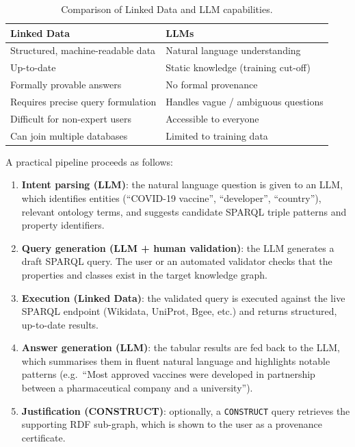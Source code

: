 \documentclass[12pt,a4paper]{article}
\begin{document}
\begin{table}[h]
\centering
\begin{tabular}{p{5.5cm} p{5.5cm}}
\toprule
\textbf{Linked Data} & \textbf{LLMs} \\
\midrule
Structured, machine-readable data & Natural language understanding \\
Up-to-date & Static knowledge (training cut-off) \\
Formally provable answers & No formal provenance \\
Requires precise query formulation & Handles vague / ambiguous questions \\
Difficult for non-expert users & Accessible to everyone \\
Can join multiple databases & Limited to training data \\
\bottomrule
\end{tabular}
\caption{Comparison of Linked Data and LLM capabilities.}
\label{tab:comparison}
\end{table}

A practical pipeline proceeds as follows:
\begin{enumerate}
  \item \textbf{Intent parsing (LLM)}: the natural language question is given
        to an LLM, which identifies entities (``COVID-19 vaccine'',
        ``developer'', ``country''), relevant ontology terms, and suggests
        candidate SPARQL triple patterns and property identifiers.
  \item \textbf{Query generation (LLM + human validation)}: the LLM generates
        a draft SPARQL query. The user or an automated validator checks that
        the properties and classes exist in the target knowledge graph.
  \item \textbf{Execution (Linked Data)}: the validated query is executed
        against the live SPARQL endpoint (Wikidata, UniProt, Bgee, etc.)
        and returns structured, up-to-date results.
  \item \textbf{Answer generation (LLM)}: the tabular results are fed back to
        the LLM, which summarises them in fluent natural language and highlights
        notable patterns (e.g.\ ``Most approved vaccines were developed in
        partnership between a pharmaceutical company and a university'').
  \item \textbf{Justification (CONSTRUCT)}: optionally, a
        \texttt{CONSTRUCT} query retrieves the supporting RDF sub-graph, which
        is shown to the user as a provenance certificate.
\end{enumerate}
\end{document}
